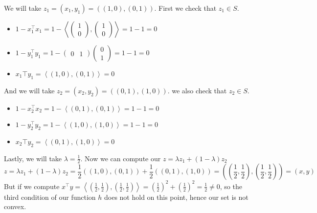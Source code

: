 \documentclass{article}
\newcommand{\tp}{^\top}
\begin{document}
\noindent We will take $z_1=(x_1,y_1)=((1,0),(0,1))$. First we check that $z_1 \in S$.
\begin{itemize}
\item $1-x_{1}\tp x_1=1-\left<\begin{pmatrix} 1\\ 0\end{pmatrix},\begin{pmatrix} 1\\ 0\end{pmatrix}\right>=1-1=0$
\item $1-y_{1}\tp y_1=1-\begin{pmatrix} 0& 1\end{pmatrix}\begin{pmatrix} 0\\ 1\end{pmatrix}=1-1=0$
\item $x_{1}\top y_1=\left<(1,0),(0,1)\right>=0$
\end{itemize}
And we will take $z_2=(x_2,y_2)=((0,1),(1,0))$. we also check that $z_2 \in S$.
\begin{itemize}
\item $1-x_{2}\tp x_2=1-\left<(0,1),(0,1)\right>=1-1=0$
\item $1-y_{2}\tp y_2=1-\left<(1,0),(1,0)\right>=1-1=0$
\item $x_{2}\top y_2=\left<(0,1),(1,0)\right>=0$
\end{itemize}
Lastly, we will take $\lambda=\frac{1}{2}$. Now we can compute our $z=\lambda z_1 + (1-\lambda) z_2$
$$z=\lambda z_1 + (1-\lambda) z_2=\frac{1}{2}((1,0),(0,1))+\frac{1}{2}((0,1),(1,0))=((\frac{1}{2},\frac{1}{2}),(\frac{1}{2},\frac{1}{2}))=(x,y)$$
But if we compute $x\tp y=\left< (\frac{1}{2},\frac{1}{2}),(\frac{1}{2},\frac{1}{2}) \right>=(\frac{1}{2})^2+(\frac{1}{2})^2=\frac{1}{2} \neq 0$, so the third condition of our function $h$ does not hold on this point, hence our set is not convex.\\
\end{document}
